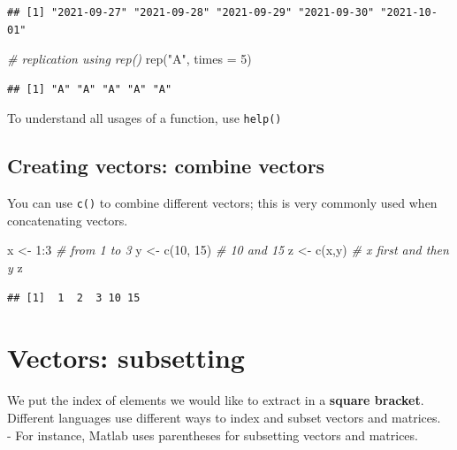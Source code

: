 \documentclass[
  11pt,
]{book}
\newenvironment{Shaded}{\begin{snugshade}}{\end{snugshade}}
\newcommand{\AttributeTok}[1]{\textcolor[rgb]{0.77,0.63,0.00}{#1}}
\newcommand{\CommentTok}[1]{\textcolor[rgb]{0.56,0.35,0.01}{\textit{#1}}}
\newcommand{\DecValTok}[1]{\textcolor[rgb]{0.00,0.00,0.81}{#1}}
\newcommand{\FunctionTok}[1]{\textcolor[rgb]{0.00,0.00,0.00}{#1}}
\newcommand{\NormalTok}[1]{#1}
\newcommand{\OtherTok}[1]{\textcolor[rgb]{0.56,0.35,0.01}{#1}}
\newcommand{\SpecialCharTok}[1]{\textcolor[rgb]{0.00,0.00,0.00}{#1}}
\newcommand{\StringTok}[1]{\textcolor[rgb]{0.31,0.60,0.02}{#1}}
\begin{document}
\begin{verbatim}
## [1] "2021-09-27" "2021-09-28" "2021-09-29" "2021-09-30" "2021-10-01"
\end{verbatim}

\begin{Shaded}
\begin{Highlighting}[]
\CommentTok{\# replication using rep()}
\FunctionTok{rep}\NormalTok{(}\StringTok{"A"}\NormalTok{, }\AttributeTok{times =} \DecValTok{5}\NormalTok{)}
\end{Highlighting}
\end{Shaded}

\begin{verbatim}
## [1] "A" "A" "A" "A" "A"
\end{verbatim}

To understand all usages of a function, use \texttt{help()}

\hypertarget{creating-vectors-combine-vectors}{%
\subsection{Creating vectors: combine vectors}\label{creating-vectors-combine-vectors}}

You can use \texttt{c()} to combine different vectors; this is very commonly used when concatenating vectors.

\begin{Shaded}
\begin{Highlighting}[]
\NormalTok{x }\OtherTok{\textless{}{-}} \DecValTok{1}\SpecialCharTok{:}\DecValTok{3} \CommentTok{\# from 1 to 3}
\NormalTok{y }\OtherTok{\textless{}{-}} \FunctionTok{c}\NormalTok{(}\DecValTok{10}\NormalTok{, }\DecValTok{15}\NormalTok{) }\CommentTok{\# 10 and 15}
\NormalTok{z }\OtherTok{\textless{}{-}} \FunctionTok{c}\NormalTok{(x,y) }\CommentTok{\# x first and then y }
\NormalTok{z}
\end{Highlighting}
\end{Shaded}

\begin{verbatim}
## [1]  1  2  3 10 15
\end{verbatim}

\hypertarget{vectors-subsetting}{%
\section{Vectors: subsetting}\label{vectors-subsetting}}

We put the index of elements we would like to extract in a \textbf{square bracket}. Different languages use different ways to index and subset vectors and matrices.\\
- For instance, Matlab uses parentheses for subsetting vectors and matrices.
\end{document}
